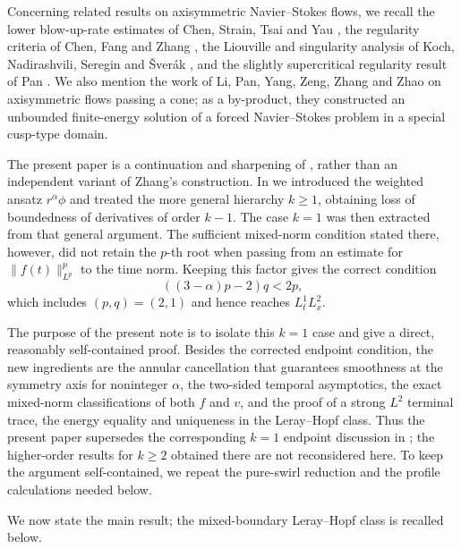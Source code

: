 \documentclass[10pt]{amsart}
\theoremstyle{definition}
\begin{document}
Concerning related results on axisymmetric Navier--Stokes flows, we recall the
lower blow-up-rate estimates of Chen, Strain, Tsai and Yau
\cite{ChenStrainTsaiYau2008,ChenStrainTsaiYau2009}, the regularity criteria of
Chen, Fang and Zhang \cite{ChenFangZhang2017}, the Liouville and singularity
analysis of Koch, Nadirashvili, Seregin and \v{S}ver\'ak
\cite{KochNadirashviliSereginSverak2009}, and the slightly supercritical
regularity result of Pan \cite{Pan2016}.  We also mention the work of Li, Pan,
Yang, Zeng, Zhang and Zhao \cite{LiPanYangZengZhangZhao2024} on axisymmetric
flows passing a cone; as a by-product, they constructed an unbounded
finite-energy solution of a forced Navier--Stokes problem in a special
cusp-type domain.

The present paper is a continuation and sharpening of \cite{BDVY2024}, rather
than an independent variant of Zhang's construction.  In \cite{BDVY2024} we
introduced the weighted ansatz $r^\alpha\phi$ and treated the more general
hierarchy $k\geq1$, obtaining loss of boundedness of derivatives of order
$k-1$.  The case $k=1$ was then extracted from that general argument.  The
sufficient mixed-norm condition stated there, however, did not retain the
$p$-th root when passing from an estimate for $\|f(t)\|_{L^p}^p$ to the time
norm.  Keeping this factor gives the correct condition
\[
    ((3-\alpha)p-2)q<2p,
\]
which includes $(p,q)=(2,1)$ and hence reaches $L^1_tL^2_x$.

The purpose of the present note is to isolate this $k=1$ case and give a direct,
reasonably self-contained proof.  Besides the corrected endpoint condition, the
new ingredients are the annular cancellation that guarantees smoothness at the
symmetry axis for noninteger $\alpha$, the two-sided temporal asymptotics, the
exact mixed-norm classifications of both $f$ and $v$, and the proof of a strong
$L^2$ terminal trace, the energy equality and uniqueness in the Leray--Hopf
class.  Thus the present paper supersedes the corresponding $k=1$ endpoint
discussion in \cite{BDVY2024}; the higher-order results for $k\geq2$ obtained
there are not reconsidered here.  To keep the argument self-contained, we
repeat the pure-swirl reduction and the profile calculations needed below.

We now state the main result; the mixed-boundary Leray--Hopf class is recalled below.
\end{document}
